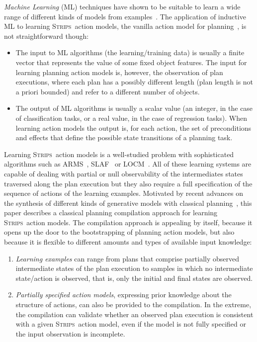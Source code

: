 \documentclass[runningheads]{llncs}
\newcommand{\strips}{\textsc{Strips}}     %
\begin{document}
{\em Machine Learning} (ML) techniques have shown to be suitable to learn a wide range of different kinds of models from examples~\cite{michalski2013machine}. The application of inductive ML to learning \strips\ action models, the vanilla action model for planning~\cite{fikes1971strips}, is not straightforward though:

\begin{itemize}
\item The input to ML algorithms (the learning/training data) is usually a finite vector that represents the value of some fixed object features. The input for learning planning action models is, however, the observation of plan executions, where each plan has a possibly different length (plan length is not a priori bounded) and refer to a different number of objects.
\item The output of ML algorithms is usually a scalar value (an integer, in the case of classification tasks, or a real value, in the case of regression tasks). When learning action models the output is, for each action, the set of preconditions and effects that define the possible state transitions of a planning task.
\end{itemize}

Learning \strips\ action models is a well-studied problem with sophisticated algorithms such as {\sc ARMS}~\cite{yang2007learning}, {\sc SLAF}~\cite{amir:alearning:JAIR08} or {\sc LOCM}~\cite{cresswell2013acquiring}. All of these learning systems are capable of dealing with partial or null observability of the intermediates states traversed along the plan execution but they also require a full specification of the sequence of actions of the learning examples. Motivated by recent advances on the synthesis of different kinds of generative models with classical planning~\cite{bonet2009automatic,segovia2017generating,segovia2018computing,segovia2019computing}, this paper describes a classical planning compilation approach for learning \strips\ action models. The compilation approach is appealing by itself, because it opens up the door to the bootstrapping of planning action models, but also because it is flexible to different amounts and types of available input knowledge:

\begin{enumerate}
\item {\em Learning examples} can range from plans that comprise partially observed intermediate states of the plan execution to samples in which no intermediate state/action is observed, that is, only the initial and final states are observed.

\item {\em Partially specified action models}, expressing prior knowledge about the structure of actions, can also be provided to the compilation. In the extreme, the compilation can validate whether an observed plan execution is consistent with a given \strips\ action model, even if the model is not fully specified or the input observation is incomplete.
\end{enumerate}
\end{document}
